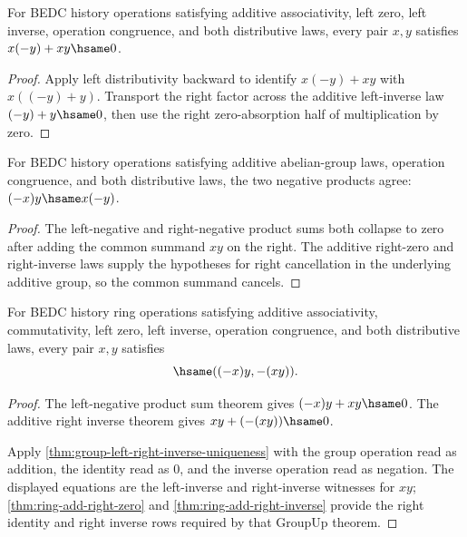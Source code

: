 \begin{theorem}
\label{thm:ring-mul-neg-right-inverse-sum-zero}
For BEDC history operations satisfying additive associativity, left zero,
left inverse, operation congruence, and both distributive laws, every pair
$x,y$ satisfies $x(-y)+xy\hsame0$.
\end{theorem}
\begin{proof}
Apply left distributivity backward to identify $x(-y)+xy$ with
$x((-y)+y)$. Transport the right factor across the additive left-inverse law
$(-y)+y\hsame0$, then use the right zero-absorption half of multiplication by
zero.
\end{proof}

\begin{theorem}
\label{thm:ring-mul-neg-left-right-same}
For BEDC history operations satisfying additive abelian-group laws, operation
congruence, and both distributive laws, the two negative products agree:
$( -x )y\hsame x(-y)$.
\end{theorem}
\begin{proof}
The left-negative and right-negative product sums both collapse to zero after
adding the common summand $xy$ on the right. The additive right-zero and
right-inverse laws supply the hypotheses for right cancellation in the
underlying additive group, so the common summand cancels.
\end{proof}

\begin{theorem}
\label{thm:ring-mul-neg-left-eq-neg-mul}
For BEDC history ring operations satisfying additive associativity,
commutativity, left zero, left inverse, operation congruence, and both
distributive laws, every pair $x,y$ satisfies
$$
\hsame((-x)y,-(xy)).
$$
\end{theorem}
\begin{proof}
The left-negative product sum theorem gives $(-x)y+xy\hsame0$. The additive
right inverse theorem gives $xy+(-(xy))\hsame0$.

Apply \autoref{thm:group-left-right-inverse-uniqueness} with the group
operation read as addition, the identity read as $0$, and the inverse operation
read as negation. The displayed equations are the left-inverse and
right-inverse witnesses for $xy$; \autoref{thm:ring-add-right-zero} and
\autoref{thm:ring-add-right-inverse} provide the right identity and right
inverse rows required by that GroupUp theorem.
\end{proof}

